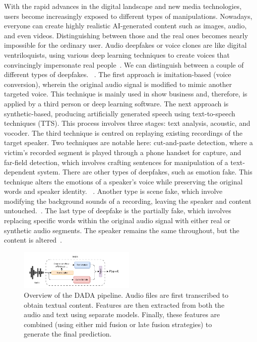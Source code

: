 \documentclass{Interspeech}
\begin{document}
With the rapid advances in the digital landscape and new media technologies,
users become increasingly exposed to different types of manipulations.
Nowadays, everyone can create highly realistic AI-generated content such as
images, audio, and even videos. Distinguishing between those and the real ones
becomes nearly impossible for the ordinary user. Audio deepfakes or voice
clones are like digital ventriloquists, using various deep learning techniques
to create voices that convincingly impersonate real people~\cite{adversarial}.
We can distinguish between a couple of different types of deepfakes.
~\cite{review_audio_deepfake_issues}. The first approach is imitation-based
(voice conversion), wherein the original audio signal is modified to mimic
another targeted voice. This technique is mainly used in show business and,
therefore, is applied by a third person or deep learning software. The next
approach is synthetic-based, producing artificially generated speech using
text-to-speech techniques (TTS). This process involves three stages: text
analysis, acoustic, and vocoder. The third technique is centred on replaying
existing recordings of the target speaker. Two techniques are notable here:
cut-and-paste detection, where a victim's recorded segment is played through a
phone handset for capture, and far-field detection, which involves crafting
sentences for manipulation of a text-dependent system. There are other types of
deepfakes, such as emotion fake. This technique alters the emotions of a
speaker's voice while preserving the original words and speaker identity.
~\cite{zhao2023emofake}. Another type is scene fake, which involve modifying
the background sounds of a recording, leaving the speaker and content
untouched.~\cite{yi2022scenefake}. The last type of deepfake is the partially
fake, which involves replacing specific words within the original audio signal
with either real or synthetic audio segments. The speaker remains the same
throughout, but the content is altered~\cite{yi2023halftruth}.

\begin{figure}[t]
  \centering
  \includegraphics[width=0.5\textwidth]{figures/overview.pdf}
  \caption{Overview of the DADA pipeline. Audio files are first transcribed to obtain textual content. Features are then extracted from both the audio and text using separate models. Finally, these features are combined (using either mid fusion or late fusion strategies) to generate the final prediction.}\label{fig:overview}
\end{figure}
\end{document}
